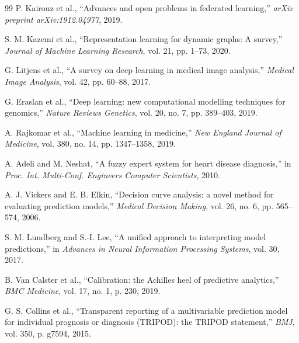 \documentclass[pdflatex,sn-mathphys-num]{sn-jnl}
\begin{document}
\begin{thebibliography}{99}
P. Kairouz et al., ``Advances and open problems in federated learning,'' \textit{arXiv preprint arXiv:1912.04977}, 2019.

S. M. Kazemi et al., ``Representation learning for dynamic graphs: A survey,'' \textit{Journal of Machine Learning Research}, vol. 21, pp. 1--73, 2020.

G. Litjens et al., ``A survey on deep learning in medical image analysis,'' \textit{Medical Image Analysis}, vol. 42, pp. 60--88, 2017.

G. Eraslan et al., ``Deep learning: new computational modelling techniques for genomics,'' \textit{Nature Reviews Genetics}, vol. 20, no. 7, pp. 389--403, 2019.

A. Rajkomar et al., ``Machine learning in medicine,'' \textit{New England Journal of Medicine}, vol. 380, no. 14, pp. 1347--1358, 2019.

A. Adeli and M. Neshat, ``A fuzzy expert system for heart disease diagnosis,'' in \textit{Proc. Int. Multi-Conf. Engineers Computer Scientists}, 2010.

A. J. Vickers and E. B. Elkin, ``Decision curve analysis: a novel method for evaluating prediction models,'' \textit{Medical Decision Making}, vol. 26, no. 6, pp. 565--574, 2006.

S. M. Lundberg and S.-I. Lee, ``A unified approach to interpreting model predictions,'' in \textit{Advances in Neural Information Processing Systems}, vol. 30, 2017.

B. Van Calster et al., ``Calibration: the Achilles heel of predictive analytics,'' \textit{BMC Medicine}, vol. 17, no. 1, p. 230, 2019.

G. S. Collins et al., ``Transparent reporting of a multivariable prediction model for individual prognosis or diagnosis (TRIPOD): the TRIPOD statement,'' \textit{BMJ}, vol. 350, p. g7594, 2015.

\end{thebibliography}
\end{document}
